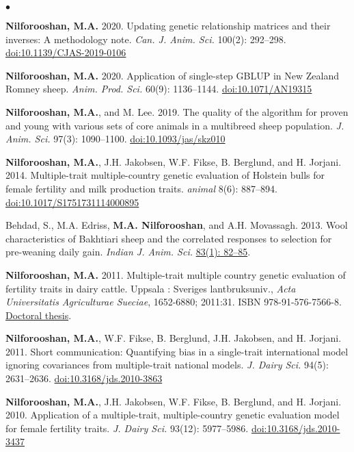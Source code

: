 \documentclass[margin,line]{res}
\newenvironment{list2}{
  \begin{list}{$\bullet$}{%
      \setlength{\itemsep}{0in}
      \setlength{\parsep}{0in} \setlength{\parskip}{0in}
      \setlength{\topsep}{0in} \setlength{\partopsep}{0in}
      \setlength{\leftmargin}{0.2in}}}{\end{list}}
\begin{document}
\begin{resume}
\begin{list2}
\item {\bf Nilforooshan, M.A.} 2020. Updating genetic relationship matrices and their inverses: A methodology note. {\em Can. J. Anim. Sci.} 100(2): 292--298. \href{https://doi.org/10.1139/CJAS-2019-0106}{doi:10.1139/CJAS-2019-0106}
\item {\bf Nilforooshan, M.A.} 2020. Application of single-step GBLUP in New Zealand Romney sheep. {\em Anim. Prod. Sci.} 60(9): 1136--1144. \href{https://doi.org/10.1071/AN19315}{doi:10.1071/AN19315}
\item {\bf Nilforooshan, M.A.}, and M. Lee. 2019. The quality of the algorithm for proven and young with various sets of core animals in a multibreed sheep population. {\em J. Anim. Sci.} 97(3): 1090--1100. \href{https://doi.org/10.1093/jas/skz010}{doi:10.1093/jas/skz010}
\item {\bf Nilforooshan, M.A.}, J.H. Jakobsen, W.F. Fikse, B. Berglund, and H. Jorjani. 2014. Multiple-trait multiple-country genetic evaluation of Holstein bulls for female fertility and milk production traits. {\em animal} 8(6): 887--894. \href{https://doi.org/10.1017/S1751731114000895}{doi:10.1017/S1751731114000895}
\item Behdad, S., M.A. Edriss, {\bf M.A. Nilforooshan}, and A.H. Movassagh. 2013. Wool characteristics of Bakhtiari sheep and the correlated responses to selection for pre-weaning daily gain. {\em Indian J. Anim. Sci.} \href{http://epubs.icar.org.in/ejournal/index.php/IJAnS/article/view/26453}{83(1): 82--85}.
\item {\bf Nilforooshan, M.A.} 2011. Multiple-trait multiple country genetic evaluation of fertility traits in dairy cattle. Uppsala : Sveriges lantbruksuniv., {\em Acta Universitatis Agriculturae Sueciae}, 1652-6880; 2011:31. ISBN 978-91-576-7566-8. \href{https://pub.epsilon.slu.se/8094}{Doctoral thesis}.
\item {\bf Nilforooshan, M.A.}, W.F. Fikse, B. Berglund, J.H. Jakobsen, and H. Jorjani. 2011. Short communication: Quantifying bias in a single-trait international model ignoring covariances from multiple-trait national models. {\em J. Dairy Sci.} 94(5): 2631--2636. \href{https://doi.org/10.3168/jds.2010-3863}{doi:10.3168/jds.2010-3863}
\item {\bf Nilforooshan, M.A.}, J.H. Jakobsen, W.F. Fikse, B. Berglund, and H. Jorjani. 2010. Application of a multiple-trait, multiple-country genetic evaluation model for female fertility traits. {\em J. Dairy Sci.} 93(12): 5977--5986. \href{https://doi.org/10.3168/jds.2010-3437}{doi:10.3168/jds.2010-3437}

\end{list2}
\end{resume}
\end{document}
